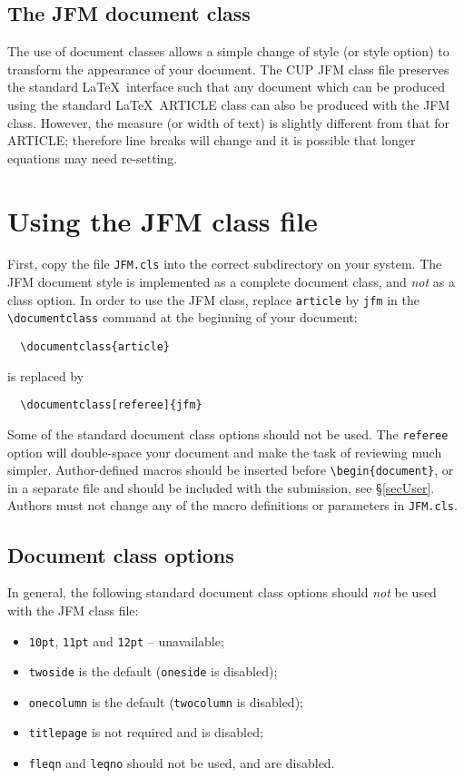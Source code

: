 \documentclass{jfm}
\begin{document}
\subsection{The JFM document class}

The use of document classes allows a simple change of style (or style option)
to transform the appearance of your document.
The CUP JFM class file preserves the standard \LaTeX\ interface such that any
document which can be  produced using the standard \LaTeX\ ARTICLE class
can also be produced with the JFM class.
However, the measure (or width of text) is slightly different from that
for ARTICLE; therefore line breaks will change and it is possible that
longer equations may need re-setting.

\section{Using the JFM class file}

First, copy the file \verb"JFM.cls" into the correct subdirectory on your
system.
The JFM document style is implemented as a complete document class, and
\emph{not} as a class option.
In order to use the JFM class, replace \verb"article" by \verb"jfm" in the
\verb"\documentclass" command at the beginning of your document:
%
\begin{verbatim}
  \documentclass{article}
\end{verbatim}
%
is replaced by
%
\begin{verbatim}
  \documentclass[referee]{jfm}
\end{verbatim}
%
Some of the standard document class options should not be used. The
\verb"referee" option will double-space your document and make the task
of reviewing much simpler.
Author-defined macros should be inserted before \verb"\begin{document}",
or in a separate file and should be included with the submission,
see \S\ref{secUser}. Authors must not change any of the macro definitions
or parameters in \verb"JFM.cls".

\subsection{Document class options}

In general, the following standard document class options should \emph{not} be
used with the JFM class file:
%
\begin{itemize}
  \item \texttt{10pt}, \texttt{11pt} and \texttt{12pt} -- unavailable;
  \item \texttt{twoside} is the default (\texttt{oneside} is disabled);
  \item \texttt{onecolumn} is the default (\texttt{twocolumn} is disabled);
  \item \texttt{titlepage} is not required and is disabled;
  \item \texttt{fleqn} and \texttt{leqno} should not be used, and are disabled.
\end{itemize}
\end{document}
